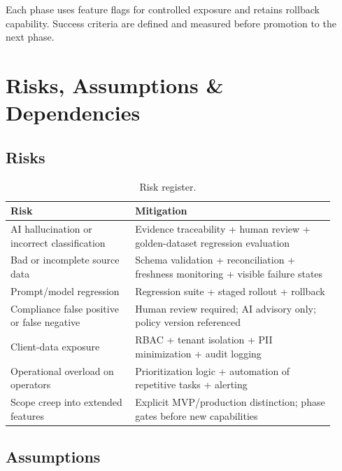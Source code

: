 \documentclass[11pt,a4paper]{article}
\begin{document}
Each phase uses feature flags for controlled exposure and retains rollback capability. Success criteria are defined and measured before promotion to the next phase.

\section{Risks, Assumptions \& Dependencies}

\subsection{Risks}

\begin{table}[H]
\centering
\small
\begin{tabular}{p{0.35\linewidth}p{0.57\linewidth}}
\toprule
\textbf{Risk} & \textbf{Mitigation} \\
\midrule
AI hallucination or incorrect classification  & Evidence traceability + human review + golden-dataset regression evaluation \\
Bad or incomplete source data                 & Schema validation + reconciliation + freshness monitoring + visible failure states \\
Prompt/model regression                       & Regression suite + staged rollout + rollback \\
Compliance false positive or false negative   & Human review required; AI advisory only; policy version referenced \\
Client-data exposure                          & RBAC + tenant isolation + PII minimization + audit logging \\
Operational overload on operators             & Prioritization logic + automation of repetitive tasks + alerting \\
Scope creep into extended features            & Explicit MVP/production distinction; phase gates before new capabilities \\
\bottomrule
\end{tabular}
\caption{Risk register.}
\end{table}

\subsection{Assumptions}
\end{document}
